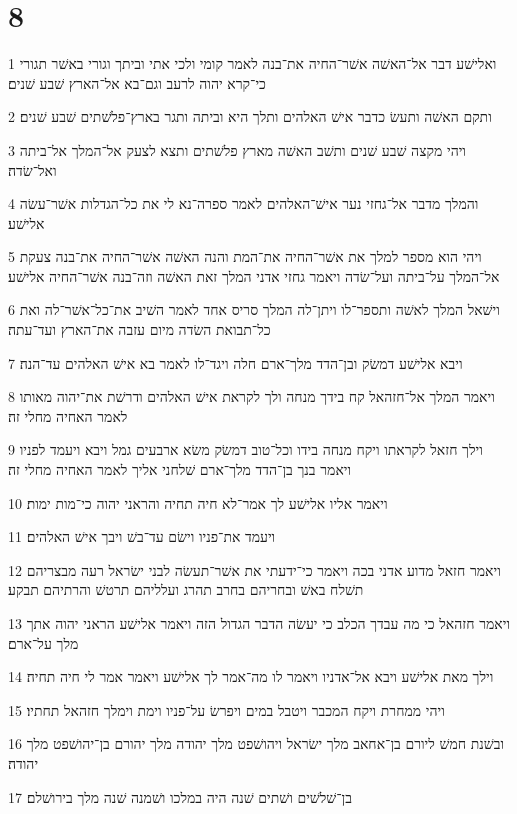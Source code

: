\chapter{8}

\par 1 ואלישׁע דבר אל־האשׁה אשׁר־החיה את־בנה לאמר קומי ולכי אתי וביתך וגורי באשׁר תגורי כי־קרא יהוה לרעב וגם־בא אל־הארץ שׁבע שׁנים׃
\par 2 ותקם האשׁה ותעשׂ כדבר אישׁ האלהים ותלך היא וביתה ותגר בארץ־פלשׁתים שׁבע שׁנים׃
\par 3 ויהי מקצה שׁבע שׁנים ותשׁב האשׁה מארץ פלשׁתים ותצא לצעק אל־המלך אל־ביתה ואל־שׂדה׃
\par 4 והמלך מדבר אל־גחזי נער אישׁ־האלהים לאמר ספרה־נא לי את כל־הגדלות אשׁר־עשׂה אלישׁע׃
\par 5 ויהי הוא מספר למלך את אשׁר־החיה את־המת והנה האשׁה אשׁר־החיה את־בנה צעקת אל־המלך על־ביתה ועל־שׂדה ויאמר גחזי אדני המלך זאת האשׁה וזה־בנה אשׁר־החיה אלישׁע׃
\par 6 וישׁאל המלך לאשׁה ותספר־לו ויתן־לה המלך סריס אחד לאמר השׁיב את־כל־אשׁר־לה ואת כל־תבואת השׂדה מיום עזבה את־הארץ ועד־עתה׃
\par 7 ויבא אלישׁע דמשׂק ובן־הדד מלך־ארם חלה ויגד־לו לאמר בא אישׁ האלהים עד־הנה׃
\par 8 ויאמר המלך אל־חזהאל קח בידך מנחה ולך לקראת אישׁ האלהים ודרשׁת את־יהוה מאותו לאמר האחיה מחלי זה׃
\par 9 וילך חזאל לקראתו ויקח מנחה בידו וכל־טוב דמשׂק משׂא ארבעים גמל ויבא ויעמד לפניו ויאמר בנך בן־הדד מלך־ארם שׁלחני אליך לאמר האחיה מחלי זה׃
\par 10 ויאמר אליו אלישׁע לך אמר־לא חיה תחיה והראני יהוה כי־מות ימות׃
\par 11 ויעמד את־פניו וישׂם עד־בשׁ ויבך אישׁ האלהים׃
\par 12 ויאמר חזאל מדוע אדני בכה ויאמר כי־ידעתי את אשׁר־תעשׂה לבני ישׂראל רעה מבצריהם תשׁלח באשׁ ובחריהם בחרב תהרג ועלליהם תרטשׁ והרתיהם תבקע׃
\par 13 ויאמר חזהאל כי מה עבדך הכלב כי יעשׂה הדבר הגדול הזה ויאמר אלישׁע הראני יהוה אתך מלך על־ארם׃
\par 14 וילך מאת אלישׁע ויבא אל־אדניו ויאמר לו מה־אמר לך אלישׁע ויאמר אמר לי חיה תחיה׃
\par 15 ויהי ממחרת ויקח המכבר ויטבל במים ויפרשׂ על־פניו וימת וימלך חזהאל תחתיו׃
\par 16 ובשׁנת חמשׁ ליורם בן־אחאב מלך ישׂראל ויהושׁפט מלך יהודה מלך יהורם בן־יהושׁפט מלך יהודה׃
\par 17 בן־שׁלשׁים ושׁתים שׁנה היה במלכו ושׁמנה שׁנה מלך בירושׁלם׃
